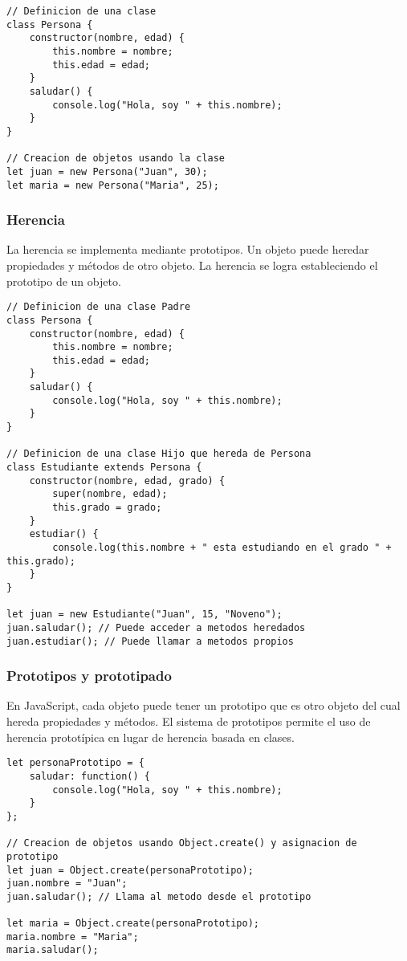 \documentclass[executivepaper]{article}
\begin{document}
\begin{lstlisting}
// Definicion de una clase
class Persona {
    constructor(nombre, edad) {
        this.nombre = nombre;
        this.edad = edad;
    }
    saludar() {
        console.log("Hola, soy " + this.nombre);
    }
}

// Creacion de objetos usando la clase
let juan = new Persona("Juan", 30);
let maria = new Persona("Maria", 25);
\end{lstlisting}
\subsubsection*{Herencia}
La herencia se implementa mediante prototipos. Un objeto puede heredar propiedades y métodos de otro objeto. La herencia se logra estableciendo el prototipo de un objeto.

\begin{lstlisting}
// Definicion de una clase Padre
class Persona {
    constructor(nombre, edad) {
        this.nombre = nombre;
        this.edad = edad;
    }
    saludar() {
        console.log("Hola, soy " + this.nombre);
    }
}

// Definicion de una clase Hijo que hereda de Persona
class Estudiante extends Persona {
    constructor(nombre, edad, grado) {
        super(nombre, edad);
        this.grado = grado;
    }
    estudiar() {
        console.log(this.nombre + " esta estudiando en el grado " + this.grado);
    }
}

let juan = new Estudiante("Juan", 15, "Noveno");
juan.saludar(); // Puede acceder a metodos heredados
juan.estudiar(); // Puede llamar a metodos propios
\end{lstlisting}

\subsubsection*{Prototipos y prototipado}
En JavaScript, cada objeto puede tener un prototipo que es otro objeto del cual hereda propiedades y métodos. El sistema de prototipos permite el uso de herencia prototípica en lugar de herencia basada en clases.
\begin{lstlisting}
let personaPrototipo = {
    saludar: function() {
        console.log("Hola, soy " + this.nombre);
    }
};

// Creacion de objetos usando Object.create() y asignacion de prototipo
let juan = Object.create(personaPrototipo);
juan.nombre = "Juan";
juan.saludar(); // Llama al metodo desde el prototipo

let maria = Object.create(personaPrototipo);
maria.nombre = "Maria";
maria.saludar();
\end{lstlisting}
\end{document}
